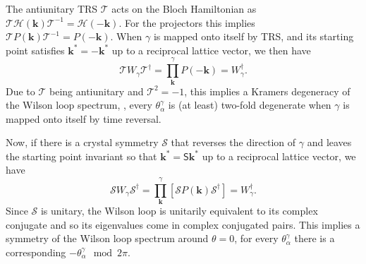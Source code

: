 The antiunitary TRS $\mathcal{T}$ acts on the Bloch Hamiltonian as $\mathcal{T} \mathcal{H}(\mathbf{k}) \mathcal{T}^{-1} = \mathcal{H}(-\mathbf{k})$. For the projectors this implies $\mathcal{T} P(\mathbf{k}) \mathcal{T}^{-1} = P(-\mathbf{k})$. When $\gamma$ is mapped onto itself by TRS, and its starting point satisfies $\mathbf{k}^* = -\mathbf{k}^*$ up to a reciprocal lattice vector, we then have 
\begin{equation}
\label{eq:TRSonWilson}
\mathcal{T} W_\gamma \mathcal{T}^\dagger = \prod_{\mathbf{k}}^{\gamma} P(-\mathbf{k}) = W_\gamma^\dagger.
\end{equation}
Due to $\mathcal{T}$ being antiunitary and $\mathcal{T}^2 = -1$, this implies a Kramers degeneracy of the Wilson loop spectrum, \ie, every $\theta_\alpha^\gamma$ is (at least) two-fold degenerate when $\gamma$ is mapped onto itself by time reversal.

Now, if there is a crystal symmetry $\mathcal{S}$ that reverses the direction of $\gamma$ and leaves the starting point invariant so that $\mathbf{k}^* = \mathsf{S} \mathbf{k}^*$ up to a reciprocal lattice vector, we have 
\begin{equation}
\label{eq:reflectiononWilson}
\mathcal{S} W_\gamma \mathcal{S}^\dagger =  \prod_{\mathbf{k}}^{\gamma} \left[\mathcal{S} P(\mathbf{k}) \mathcal{S}^\dagger \right]
= W_\gamma^\dagger.
\end{equation}
Since $\mathcal{S}$ is unitary, the Wilson loop is unitarily equivalent to its complex conjugate and so its eigenvalues come in complex conjugated pairs. This implies a symmetry of the Wilson loop spectrum around $\theta=0$, for every $\theta_\alpha^\gamma$ there is a corresponding $-\theta_\alpha^\gamma \mod 2\pi$.

